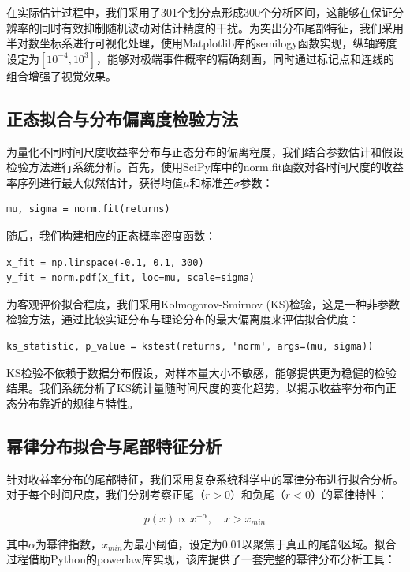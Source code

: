 \documentclass[12pt, a4paper]{article}
\begin{document}
在实际估计过程中，我们采用了301个划分点形成300个分析区间，这能够在保证分辨率的同时有效抑制随机波动对估计精度的干扰。为突出分布尾部特征，我们采用半对数坐标系进行可视化处理，使用Matplotlib库的semilogy函数实现，纵轴跨度设定为$[10^{-4}, 10^3]$，能够对极端事件概率的精确刻画，同时通过标记点和连线的组合增强了视觉效果。

\subsection{正态拟合与分布偏离度检验方法}

为量化不同时间尺度收益率分布与正态分布的偏离程度，我们结合参数估计和假设检验方法进行系统分析。首先，使用SciPy库中的norm.fit函数对各时间尺度的收益率序列进行最大似然估计，获得均值$\mu$和标准差$\sigma$参数：

\begin{verbatim}
mu, sigma = norm.fit(returns)
\end{verbatim}

随后，我们构建相应的正态概率密度函数：

\begin{verbatim}
x_fit = np.linspace(-0.1, 0.1, 300)
y_fit = norm.pdf(x_fit, loc=mu, scale=sigma)
\end{verbatim}

为客观评价拟合程度，我们采用Kolmogorov-Smirnov (KS)检验，这是一种非参数检验方法，通过比较实证分布与理论分布的最大偏离度来评估拟合优度：

\begin{verbatim}
ks_statistic, p_value = kstest(returns, 'norm', args=(mu, sigma))
\end{verbatim}

KS检验不依赖于数据分布假设，对样本量大小不敏感，能够提供更为稳健的检验结果。我们系统分析了KS统计量随时间尺度的变化趋势，以揭示收益率分布向正态分布靠近的规律与特性。

\subsection{幂律分布拟合与尾部特征分析}

针对收益率分布的尾部特征，我们采用复杂系统科学中的幂律分布进行拟合分析。对于每个时间尺度，我们分别考察正尾（$r > 0$）和负尾（$r < 0$）的幂律特性：

\begin{equation}
p(x) \propto x^{-\alpha}, \quad x > x_{min}
\end{equation}

其中$\alpha$为幂律指数，$x_{min}$为最小阈值，设定为0.01以聚焦于真正的尾部区域。拟合过程借助Python的powerlaw库实现，该库提供了一套完整的幂律分布分析工具：
\end{document}
